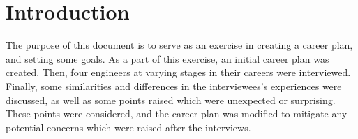 \section{Introduction}

The purpose of this document is to serve as an exercise in creating a career
plan, and setting some goals. As a part of this exercise, an initial career
plan was created. Then, four engineers at varying stages in their
careers were interviewed. Finally, some similarities and differences in the
interviewees's  experiences were discussed, as well as some points raised which
were unexpected or surprising. These points were considered, and the career
plan was modified to mitigate any potential concerns which were raised after
the interviews.
